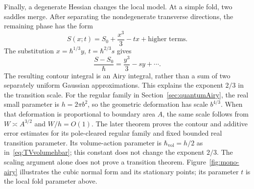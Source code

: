 Finally, a degenerate Hessian changes the local model. At a simple
fold, two saddles merge. After separating the nondegenerate
transverse directions, the remaining phase has the form
\[
 S(x;t)=S_0+\frac{x^3}{3}-tx+\text{higher terms}.
\]
The substitution $x=\hbar^{1/3}y$, $t=\hbar^{2/3}s$ gives
\[
 \frac{S-S_0}{\hbar}=\frac{y^3}{3}-sy+\cdots.
\]
The resulting contour integral is an Airy integral, rather than
a sum of two separately uniform Gaussian approximations. This
explains the exponent $2/3$ in the transition scale. For the regular
family in Section~\ref{sec:quantumAiry}, the real small parameter
is $h=2\pi b^2$, so the geometric deformation has scale
$b^{4/3}$. When that deformation is proportional to boundary area
$A$, the same scale follows from $W\asymp A^{3/2}$ and $W/h=O(1)$.
The later theorem proves the contour and additive error estimates
for its pole-cleared regular family and fixed bounded real
transition parameter. Its volume-action parameter is
$\hbar_{\mathrm{vol}}=h/2$ as in~\eqref{eq:TVvolumehbar}; this
constant does not change the exponent $2/3$. The scaling argument
alone does not prove a transition theorem.
Figure~\ref{fig:mono-airy} illustrates the cubic normal form and its
stationary points; its parameter $t$ is the local fold parameter above.

